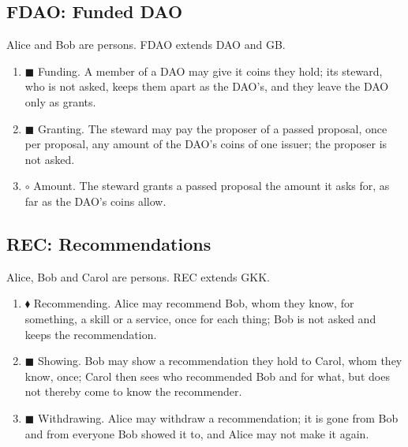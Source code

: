\subsection*{FDAO: Funded DAO}
\begin{contractbox}
Alice and Bob are persons.  FDAO extends DAO and GB.\par\smallskip
\begin{enumerate}[leftmargin=*]
\item $\blacksquare$ Funding.  A member of a DAO may give it coins they hold; its steward, who is not asked, keeps them apart as the DAO's, and they leave the DAO only as grants.
\item $\blacksquare$ Granting.  The steward may pay the proposer of a passed proposal, once per proposal, any amount of the DAO's coins of one issuer; the proposer is not asked.
\item $\circ$ Amount.  The steward grants a passed proposal the amount it asks for, as far as the DAO's coins allow.
\end{enumerate}
\end{contractbox}

\subsection*{REC: Recommendations}
\begin{contractbox}
Alice, Bob and Carol are persons.  REC extends GKK.\par\smallskip
\begin{enumerate}[leftmargin=*]
\item $\blacklozenge$ Recommending.  Alice may recommend Bob, whom they know, for something, a skill or a service, once for each thing; Bob is not asked and keeps the recommendation.
\item $\blacksquare$ Showing.  Bob may show a recommendation they hold to Carol, whom they know, once; Carol then sees who recommended Bob and for what, but does not thereby come to know the recommender.
\item $\blacksquare$ Withdrawing.  Alice may withdraw a recommendation; it is gone from Bob and from everyone Bob showed it to, and Alice may not make it again.
\end{enumerate}
\end{contractbox}

